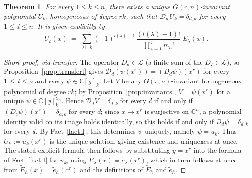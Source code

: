 \documentclass[10pt,a4paper]{amsart}
\newtheorem{theorem}{Theorem}[section]
\newcommand{\CC}{\mathbb{C}}
\begin{document}
\begin{theorem}\label{thm:main}
For every $1\le k\le n$, there exists a unique $G(r,n)$-invariant polynomial $U_k$, homogeneous of degree $rk$, such that $\mathcal D_d\, U_k = \delta_{d,k}$ for every $1\le d\le n$. It is given explicitly by
\[
U_k(x) \;=\; \sum_{\lambda\vdash k} (-1)^{l(\lambda)-1}\,\frac{(l(\lambda)-1)!}{\prod_{h=1}^{k} m_h!}\; \widetilde E_\lambda(x).
\]
\end{theorem}

\begin{proof}[Short proof, via transfer]
The operator $D_d\in\mathcal L$ (a finite sum of the $D_I\in\mathcal L$), so Proposition~\ref{prop:transfert} gives $\mathcal D_d(\psi(x^r))=(D_d\psi)(x^r)$ for every $1\le d\le n$ and every $\psi\in\CC[y]_k$. Let $V$ be any $G(r,n)$-invariant homogeneous polynomial of degree $rk$; by Proposition~\ref{prop:invariants}, $V=\psi(x^r)$ for a unique $\psi\in\CC[y]^{S_n}_k$. Hence $\mathcal D_dV=\delta_{d,k}$ for every $d$ if and only if $(D_d\psi)(x^r)=\delta_{d,k}$ for every $d$; since $x\mapsto x^r$ is surjective on $\CC^n$, a polynomial identity valid on its image holds identically, so this holds if and only if $D_d\psi=\delta_{d,k}$ for every $d$. By Fact~\ref{fact:I}, this determines $\psi$ uniquely, namely $\psi=u_k$. Thus $U_k:=u_k(x^r)$ is the unique solution, giving existence and uniqueness at once. The stated explicit formula then follows by substituting $y=x^r$ into the formula of Fact~\ref{fact:I} for $u_k$, using $\widetilde E_\lambda(x)=\tilde e_\lambda(x^r)$, which in turn follows at once from $\widetilde E_h(x)=\tilde e_h(x^r)$ and the definitions of $\widetilde E_h$ and $\tilde e_h$.
\end{proof}
\end{document}
